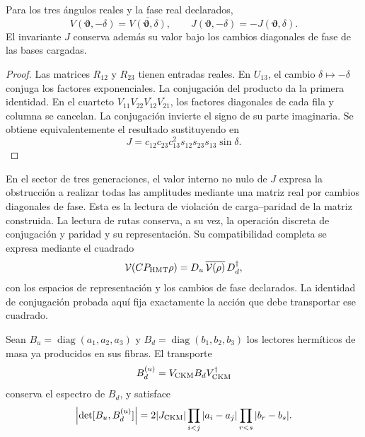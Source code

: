 \begin{proposition}
\label{ii:prop:ii09-conjugacion-unitaria}
Para los tres ángulos reales y la fase real declarados,
\[
 V(\boldsymbol\vartheta,-\delta)
       =\overline{V(\boldsymbol\vartheta,\delta)},
 \qquad
 J(\boldsymbol\vartheta,-\delta)
       =-J(\boldsymbol\vartheta,\delta).
\]
El invariante \(J\) conserva además su valor bajo los cambios
diagonales de fase de las bases cargadas.
\end{proposition}
\begin{proof}
Las matrices \(R_{12}\) y \(R_{23}\) tienen entradas reales.
En \(U_{13}\), el cambio \(\delta\mapsto-\delta\) conjuga
los factores exponenciales. La conjugación del producto da la
primera identidad. En el cuarteto
\(V_{11}V_{22}\overline{V_{12}}\overline{V_{21}}\), los
factores diagonales de cada fila y columna se cancelan. La
conjugación invierte el signo de su parte imaginaria. Se obtiene
equivalentemente el resultado sustituyendo en
\[
 J=c_{12}c_{23}c_{13}^{2}s_{12}s_{23}s_{13}\sin\delta.
\]
\end{proof}

En el sector de tres generaciones, el valor interno no nulo de
\(J\) expresa la obstrucción a realizar todas las amplitudes
mediante una matriz real por cambios diagonales de fase. Esta
es la lectura de violación de carga--paridad de la matriz
construida. La lectura de rutas conserva, a su vez, la operación
discreta de conjugación y paridad y su representación. Su
compatibilidad completa se expresa mediante el cuadrado
\[
 \mathcal V(CP_{\rm HMT}\rho)
  =D_u\,\overline{\mathcal V(\rho)}\,D_d^{\dagger},
\]
con los espacios de representación y los cambios de fase
declarados. La identidad de conjugación probada aquí fija
exactamente la acción que debe transportar ese cuadrado.



\begin{proposition}
Sean \(B_u=\operatorname{diag}(a_1,a_2,a_3)\) y
\(B_d=\operatorname{diag}(b_1,b_2,b_3)\) los lectores hermíticos de masa
ya producidos en sus fibras. El transporte
\begin{equation}
 B_d^{(u)}=V_{\rm CKM}B_dV_{\rm CKM}^{\dagger}
 \label{ii:eq:ii-ckm-mass-transport}
\end{equation}
conserva el espectro de \(B_d\), y satisface
\begin{equation}
 \left|\det[B_u,B_d^{(u)}]\right|
 =2|J_{\rm CKM}|
   \prod_{i<j}|a_i-a_j|\prod_{r<s}|b_r-b_s|.
 \label{ii:eq:ii-ckm-commutator}
\end{equation}
\end{proposition}

